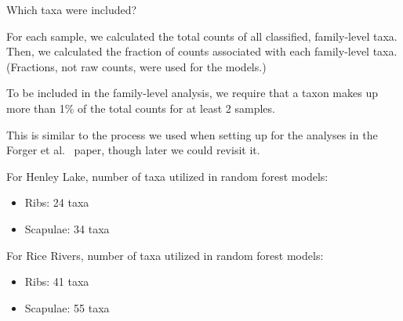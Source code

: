 \documentclass{beamer}
\begin{document}
\begin{frame}{Which taxa were included?}

  {\footnotesize
  \noindent For each sample, we calculated the total counts of all
  classified, family-level taxa.  Then, we calculated the fraction of
  counts associated with each family-level taxa.  (Fractions, not raw
  counts, were used for the models.)

  \vspace{0.1in}

  \noindent To be included in the family-level analysis, we require that a taxon
  makes up more than 1\% of the total counts for at least 2 samples.

  \vspace{0.1in}

  \noindent This is similar to the process we used when setting up for
  the analyses in the Forger et al.~ paper, though later we could
  revisit it.

  \vspace{0.1in}

  \noindent For Henley Lake, number of taxa utilized in random forest models:
  \begin{itemize}
    \item Ribs: 24 taxa
    \item Scapulae: 34 taxa
  \end{itemize}

  \vspace{0.1in}
  
  \noindent For Rice Rivers, number of taxa utilized in random forest models:
  \begin{itemize}
    \item Ribs: 41 taxa
    \item Scapulae: 55 taxa
  \end{itemize}
}

\end{frame}
\end{document}

